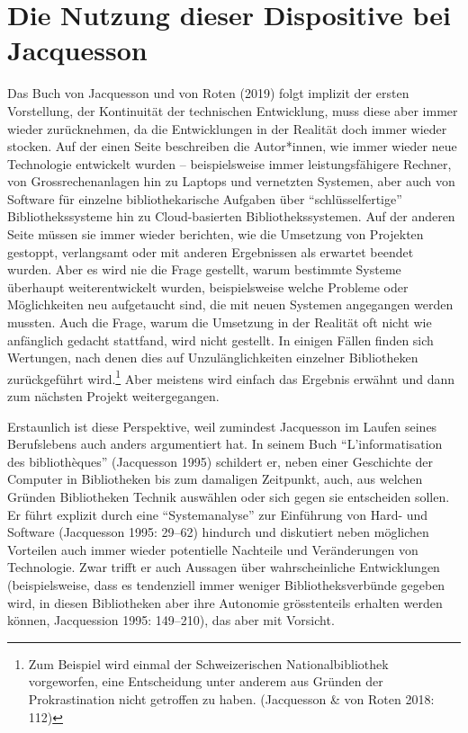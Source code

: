 \documentclass[a4paper,
fontsize=11pt,
oneside,
numbers=noperiodatend,
parskip=half-,
bibliography=totoc,
final
]{scrartcl}
\begin{document}
\hypertarget{die-nutzung-dieser-dispositive-bei-jacquesson}{%
\section{Die Nutzung dieser Dispositive bei
Jacquesson}\label{die-nutzung-dieser-dispositive-bei-jacquesson}}

Das Buch von Jacquesson und von Roten (2019) folgt implizit der ersten
Vorstellung, der Kontinuität der technischen Entwicklung, muss diese
aber immer wieder zurücknehmen, da die Entwicklungen in der Realität
doch immer wieder stocken. Auf der einen Seite beschreiben die
Autor*innen, wie immer wieder neue Technologie entwickelt wurden --
beispielsweise immer leistungsfähigere Rechner, von Grossrechenanlagen
hin zu Laptops und vernetzten Systemen, aber auch von Software für
einzelne bibliothekarische Aufgaben über \enquote{schlüsselfertige}
Bibliothekssysteme hin zu Cloud-basierten Bibliothekssystemen. Auf der
anderen Seite müssen sie immer wieder berichten, wie die Umsetzung von
Projekten gestoppt, verlangsamt oder mit anderen Ergebnissen als
erwartet beendet wurden. Aber es wird nie die Frage gestellt, warum
bestimmte Systeme überhaupt weiterentwickelt wurden, beispielsweise
welche Probleme oder Möglichkeiten neu aufgetaucht sind, die mit neuen
Systemen angegangen werden mussten. Auch die Frage, warum die Umsetzung
in der Realität oft nicht wie anfänglich gedacht stattfand, wird nicht
gestellt. In einigen Fällen finden sich Wertungen, nach denen dies auf
Unzulänglichkeiten einzelner Bibliotheken zurückgeführt wird.\footnote{Zum
  Beispiel wird einmal der Schweizerischen Nationalbibliothek
  vorgeworfen, eine Entscheidung unter anderem aus Gründen der
  Prokrastination nicht getroffen zu haben. (Jacquesson \& von Roten
  2018: 112)} Aber meistens wird einfach das Ergebnis erwähnt und dann
zum nächsten Projekt weitergegangen.

Erstaunlich ist diese Perspektive, weil zumindest Jacquesson im Laufen
seines Berufslebens auch anders argumentiert hat. In seinem Buch
\enquote{L'informatisation des bibliothèques} (Jacquesson 1995)
schildert er, neben einer Geschichte der Computer in Bibliotheken bis
zum damaligen Zeitpunkt, auch, aus welchen Gründen Bibliotheken Technik
auswählen oder sich gegen sie entscheiden sollen. Er führt explizit
durch eine \enquote{Systemanalyse} zur Einführung von Hard- und
Software (Jacquesson 1995: 29--62) hindurch und diskutiert neben möglichen
Vorteilen auch immer wieder potentielle Nachteile und Veränderungen von
Technologie. Zwar trifft er auch Aussagen über wahrscheinliche
Entwicklungen (beispielsweise, dass es tendenziell immer weniger
Bibliotheksverbünde gegeben wird, in diesen Bibliotheken aber ihre
Autonomie grösstenteils erhalten werden können, Jacquession 1995:
149--210), das aber mit Vorsicht.
\end{document}
